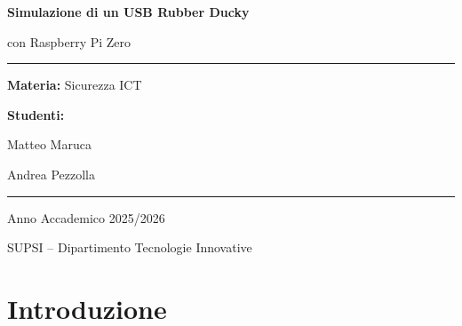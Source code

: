 \documentclass[12pt,a4paper]{article}
\begin{document}
\begin{titlepage}
    \centering
    \vspace*{2cm}
    
    {\Huge\bfseries Simulazione di un USB Rubber Ducky\\[0.5cm]}
    {\Large con Raspberry Pi Zero\par}
    
    \vspace{1cm}
    \rule{\linewidth}{0.5mm}
    \vspace{1cm}
    
    {\large\textbf{Materia:} Sicurezza ICT\par}
    \vspace{0.5cm}
    {\large\textbf{Studenti:}\par}
    {\Large Matteo Maruca\par}
    {\Large Andrea Pezzolla\par}
    
    \vspace{1cm}
    \rule{\linewidth}{0.5mm}
    \vspace{1cm}
    
    {\large Anno Accademico 2025/2026\par}
    \vspace{0.5cm}
    {\large SUPSI -- Dipartimento Tecnologie Innovative\par}
    
    \vfill
    
    \begin{abstract}
    Questo report documenta la realizzazione di un dispositivo USB Rubber Ducky utilizzando
    un Raspberry Pi Zero W. Il progetto esplora le tecniche di attacco HID (Human Interface Device),
    la simulazione di una tastiera USB automatizzata e l'implementazione di un sistema di controllo
    remoto tramite rete Ethernet. L'obiettivo didattico è comprendere le vulnerabilità legate
    ai dispositivi USB e le relative contromisure difensive.
    \end{abstract}
\end{titlepage}

\tableofcontents
\newpage

\section{Introduzione}
\end{document}
